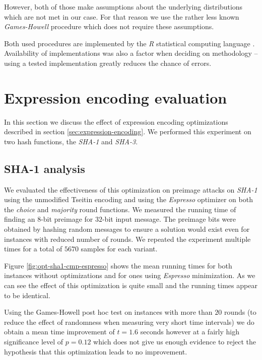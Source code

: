 However, both of those make assumptions about the underlying distributions which are not met in our case.
For that reason we use the rather less known \emph{Games-Howell} procedure \cite{games1976pairwise} which does not require these assumptions.

Both used procedures are implemented by the \emph{R} statistical computing language \cite{rteam2013}.
Availability of implementations was also a factor when deciding on methodology -- using a tested implementation greatly reduces the chance of errors.

\section{Expression encoding evaluation}
\label{sec:expression-encoding-eval}
In this section we discuss the effect of expression encoding optimizations described in section \ref{sec:expression-encoding}.
We performed this experiment on two hash functions, the \emph{SHA-1} and \emph{SHA-3}.

\subsection{SHA-1 analysis}
We evaluated the effectiveness of this optimization on preimage attacks on \emph{SHA-1} using the unmodified Tseitin encoding and using the \emph{Espresso} optimizer on both the \emph{choice} and \emph{majority} round functions.
We measured the running time of finding an $8$-bit preimage for $32$-bit input message.
The preimage bits were obtained by hashing random messages to ensure a solution would exist even for instances with reduced number of rounds.
We repeated the experiment multiple times for a total of $5670$ samples for each variant.
 
Figure \ref{fig:opt-sha1-cmp-espresso} shows the mean running times for both instances without optimizations and for ones using \emph{Espresso} minimization.
As we can see the effect of this optimization is quite small and the running times appear to be identical.

%

Using the Games-Howell post hoc test on instances with more than $20$ rounds (to reduce the effect of randomness when measuring very short time intervals) we do obtain a mean time improvement of $t=1.6$ seconds however at a fairly high significance level of $p=0.12$ which does not give us enough evidence to reject the hypothesis that this optimization leads to no improvement.

